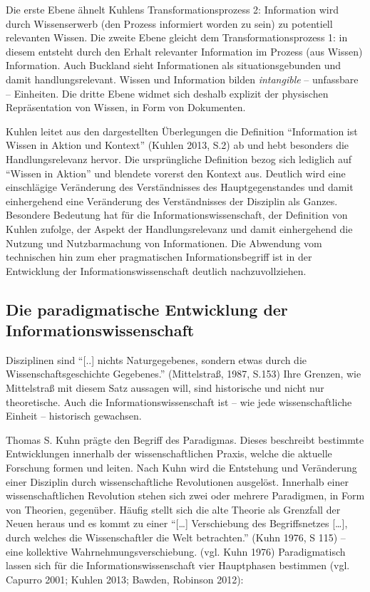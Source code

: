 \documentclass[a4paper,
fontsize=11pt,
oneside,
numbers=noperiodatend,
parskip=half-,
bibliography=totoc,
final
]{scrartcl}
\begin{document}
Die erste Ebene ähnelt Kuhlens Transformationsprozess 2: Information
wird durch Wissenserwerb (den Prozess informiert worden zu sein) zu
potentiell relevanten Wissen. Die zweite Ebene gleicht dem
Transformationsprozess 1: in diesem entsteht durch den Erhalt relevanter
Information im Prozess (aus Wissen) Information. Auch Buckland sieht
Informationen als situationsgebunden und damit handlungsrelevant. Wissen
und Information bilden \emph{intangible} -- unfassbare -- Einheiten. Die
dritte Ebene widmet sich deshalb explizit der physischen Repräsentation
von Wissen, in Form von Dokumenten.

Kuhlen leitet aus den dargestellten Überlegungen die Definition
\enquote{Information ist Wissen in Aktion und Kontext} (Kuhlen 2013,
S.2) ab und hebt besonders die Handlungsrelevanz hervor. Die
ursprüngliche Definition bezog sich lediglich auf \enquote{Wissen in
Aktion} und blendete vorerst den Kontext aus. Deutlich wird eine
einschlägige Veränderung des Verständnisses des Hauptgegenstandes und
damit einhergehend eine Veränderung des Verständnisses der Disziplin als
Ganzes. Besondere Bedeutung hat für die Informationswissenschaft, der
Definition von Kuhlen zufolge, der Aspekt der Handlungsrelevanz und
damit einhergehend die Nutzung und Nutzbarmachung von Informationen. Die
Abwendung vom technischen hin zum eher pragmatischen Informationsbegriff
ist in der Entwicklung der Informationswissenschaft deutlich
nachzuvollziehen.

\subsection*{Die paradigmatische Entwicklung der
Informationswissenschaft}\label{die-paradigmatische-entwicklung-der-informationswissenschaft}

Disziplinen sind \enquote{{[}..{]} nichts Naturgegebenes, sondern etwas
durch die Wissenschaftsgeschichte Gegebenes.} (Mittelstraß, 1987, S.153)
Ihre Grenzen, wie Mittelstraß mit diesem Satz aussagen will, sind
historische und nicht nur theoretische. Auch die
Informationswissenschaft ist -- wie jede wissenschaftliche Einheit --
historisch gewachsen.

Thomas S. Kuhn prägte den Begriff des Paradigmas. Dieses beschreibt
bestimmte Entwicklungen innerhalb der wissenschaftlichen Praxis, welche
die aktuelle Forschung formen und leiten. Nach Kuhn wird die Entstehung
und Veränderung einer Disziplin durch wissenschaftliche Revolutionen
ausgelöst. Innerhalb einer wissenschaftlichen Revolution stehen sich
zwei oder mehrere Paradigmen, in Form von Theorien, gegenüber. Häufig
stellt sich die alte Theorie als Grenzfall der Neuen heraus und es kommt
zu einer \enquote{{[}\ldots{}{]} Verschiebung des Begriffsnetzes
{[}\ldots{}{]}, durch welches die Wissenschaftler die Welt betrachten.}
(Kuhn 1976, S 115) -- eine kollektive Wahrnehmungsverschiebung. (vgl.
Kuhn 1976) Paradigmatisch lassen sich für die Informationswissenschaft
vier Hauptphasen bestimmen (vgl. Capurro 2001; Kuhlen 2013; Bawden,
Robinson 2012):
\end{document}
